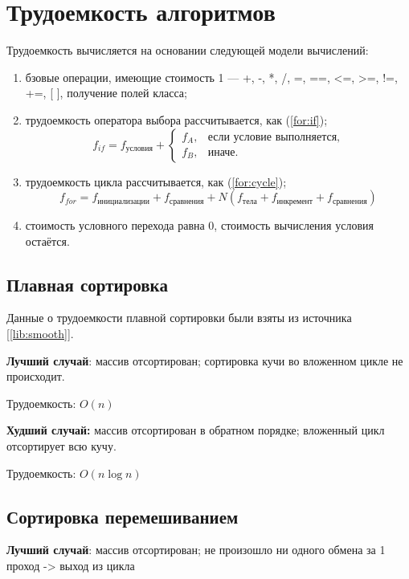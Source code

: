\section{Трудоемкость алгоритмов}
Трудоемкость вычисляется на основании следующей модели вычислений:
\begin{enumerate}
	\item  бзовые операции, имеющие стоимость 1 — +, -, *, /, =, ==, <=, >=, !=, +=, [ ], получение полей класса;
	\item трудоемкость оператора выбора  рассчитывается, как (\ref{for:if});
	\begin{equation}
		\label{for:if}
		f_{if} = f_{\text{условия}} +
		\begin{cases}
			f_A, & \text{если условие выполняется,}\\
			f_B, & \text{иначе.}
		\end{cases}
	\end{equation}
	\item трудоемкость цикла рассчитывается, как (\ref{for:cycle});
	\begin{equation}
		\label{for:cycle}
		f_{for} = f_{\text{инициализации}} + f_{\text{сравнения}} + N(f_{\text{тела}} + f_{\text{инкремент}} + f_{\text{сравнения}})
	\end{equation}
	\item стоимость условного перехода равна 0, стоимость вычисления условия остаётся.
\end{enumerate}

\subsection{Плавная сортировка}

Данные о трудоемкости плавной сортировки были взяты из источника [\ref{lib:smooth}].


\textbf{Лучший случай}: массив отсортирован; сортировка кучи во вложенном цикле не происходит.


Трудоемкость: $O(n)$


\textbf{Худший случай:} массив отсортирован в обратном порядке; вложенный цикл отсортирует всю кучу.


Трудоемкость: $O(n\log{n})$
\subsection{Сортировка перемешиванием}
\textbf{Лучший случай}: массив отсортирован; не произошло ни одного обмена за 1 проход -> выход из цикла


